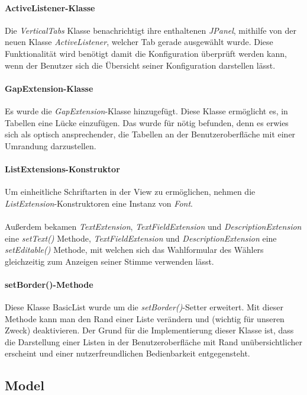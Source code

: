 \documentclass[parskip=full]{scrartcl}
\begin{document}
\paragraph{ActiveListener-Klasse}
Die \textit{VerticalTabs} Klasse benachrichtigt ihre enthaltenen \textit{JPanel}, mithilfe von der neuen Klasse \textit{ActiveListener}, welcher Tab gerade ausgewählt wurde. Diese Funktionalität wird benötigt damit die Konfiguration überprüft werden kann, wenn der Benutzer sich die Übersicht seiner Konfiguration darstellen lässt. 

\paragraph{GapExtension-Klasse}
Es wurde die \textit{GapExtension}-Klasse hinzugefügt. Diese Klasse ermöglicht es, in Tabellen eine Lücke einzufügen. Das wurde für nötig befunden, denn es erwies sich als optisch ansprechender, die Tabellen an der Benutzeroberfläche mit einer Umrandung darzustellen.

\paragraph{ListExtensions-Konstruktor}
Um einheitliche Schriftarten in der View zu ermöglichen, nehmen die \textit{ListExtension}-Konstruktoren eine Instanz von \textit{Font}.
\\
\\
Außerdem bekamen \textit{TextExtension}, \textit{TextFieldExtension} und \textit{DescriptionExtension} eine \textit{setText()} Methode, \textit{TextFieldExtension} und \textit{DescriptionExtension} eine \textit{setEditable()} Methode, mit welchen sich das Wahlformular des Wählers gleichzeitig zum Anzeigen seiner Stimme verwenden lässt.

\paragraph{setBorder()-Methode}
Diese Klasse BasicList wurde um die \textit{setBorder()}-Setter erweitert. Mit dieser Methode kann man den Rand einer Liste verändern und (wichtig für unseren Zweck) deaktivieren. Der Grund für die Implementierung dieser Klasse ist, dass die Darstellung einer Listen in der Benutzeroberfläche mit Rand unübersichtlicher erscheint und einer nutzerfreundlichen Bedienbarkeit entgegensteht.

\subsection{Model}
\end{document}
